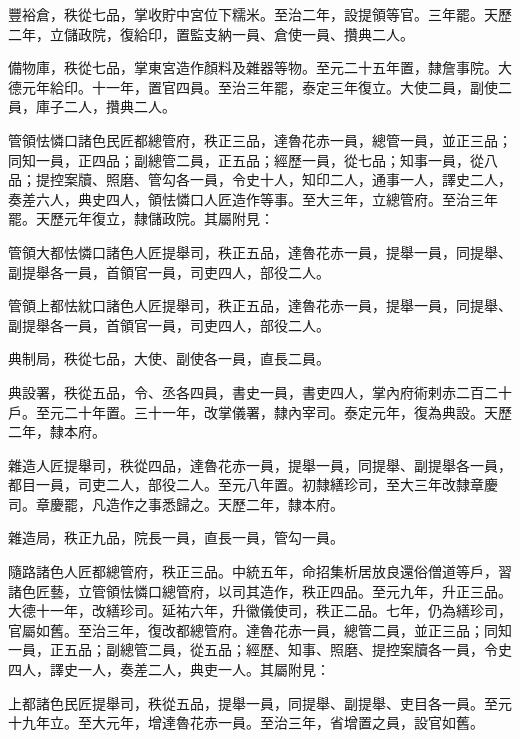 \begin{pinyinscope}
 豐裕倉，秩從七品，掌收貯中宮位下糯米。至治二年，設提領等官。三年罷。天歷二年，立儲政院，復給印，置監支納一員、倉使一員、攢典二人。



 備物庫，秩從七品，掌東宮造作顏料及雜器等物。至元二十五年置，隸詹事院。大德元年給印。十一年，置官四員。至治三年罷，泰定三年復立。大使二員，副使二員，庫子二人，攢典二人。



 管領怯憐口諸色民匠都總管府，秩正三品，達魯花赤一員，總管一員，並正三品；同知一員，正四品；副總管二員，正五品；經歷一員，從七品；知事一員，從八品；提控案牘、照磨、管勾各一員，令史十人，知印二人，通事一人，譯史二人，奏差六人，典史四人，領怯憐口人匠造作等事。至大三年，立總管府。至治三年罷。天歷元年復立，隸儲政院。其屬附見：



 管領大都怯憐口諸色人匠提舉司，秩正五品，達魯花赤一員，提舉一員，同提舉、副提舉各一員，首領官一員，司吏四人，部役二人。



 管領上都怯紞口諸色人匠提舉司，秩正五品，達魯花赤一員，提舉一員，同提舉、副提舉各一員，首領官一員，司吏四人，部役二人。



 典制局，秩從七品，大使、副使各一員，直長二員。



 典設署，秩從五品，令、丞各四員，書史一員，書吏四人，掌內府術剌赤二百二十戶。至元二十年置。三十一年，改掌儀署，隸內宰司。泰定元年，復為典設。天歷二年，隸本府。



 雜造人匠提舉司，秩從四品，達魯花赤一員，提舉一員，同提舉、副提舉各一員，都目一員，司吏二人，部役二人。至元八年置。初隸繕珍司，至大三年改隸章慶司。章慶罷，凡造作之事悉歸之。天歷二年，隸本府。



 雜造局，秩正九品，院長一員，直長一員，管勾一員。



 隨路諸色人匠都總管府，秩正三品。中統五年，命招集析居放良還俗僧道等戶，習諸色匠藝，立管領怯憐口總管府，以司其造作，秩正四品。至元九年，升正三品。大德十一年，改繕珍司。延祐六年，升徽儀使司，秩正二品。七年，仍為繕珍司，官屬如舊。至治三年，復改都總管府。達魯花赤一員，總管二員，並正三品；同知一員，正五品；副總管二員，從五品；經歷、知事、照磨、提控案牘各一員，令史四人，譯史一人，奏差二人，典吏一人。其屬附見：



 上都諸色民匠提舉司，秩從五品，提舉一員，同提舉、副提舉、吏目各一員。至元十九年立。至大元年，增達魯花赤一員。至治三年，省增置之員，設官如舊。




\end{pinyinscope}
